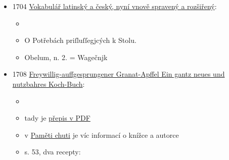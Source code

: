 \begin{itemize}
\begin{itemize}
    \begin{itemize}
    \tightlist
    \item
      č. 212 Gute Speiß-Krapfen:
    \item
      Vezmi jednu žejdlík (nádobu) dobrého sladkého mléka a kus másla o
      velikosti vejce. Nech je společně rozpustit, poté k tomu přidej 2
      lžíce pivovarských kvasnic a 5 žloutků -- vše dobře rozšlehané.
      Poté, když je přidána pěkná (hladká), předem nahřátá mouka,
      vypracuj tuhé těsto, které nelepí. Rukama ho dobře propracuj a
      vlož do mísy, kterou postav k peci, aby těsto vykynulo.
    \item
      Poté jej můžeš vyválet, rozkrájet na 3 kusy a vytvarovat do
      pěkných podlouhlých tvarů. Poté pomaž příslušný špíz (rožeň)
      máslem a nech ho nahřát. Těsto na něj dokola naviň a potři ho
      směsí drceného zázvoru a žloutků. Peč ho u jasného ohně, dokud
      neztuhne. Průběžně ho dobře potírej rozpuštěným máslem, dokud
      nezhnědne. Musí se jíst teplé.
    \end{itemize}
  \end{itemize}
\item
  1704
  \href{https://bara.ujc.cas.cz/slovniky/vokabular/vokabular12.html}{Vokabulář
  latinský a český, nyní vnově spravený a rozšiřený}:

  \begin{itemize}
  \tightlist
  \item
  \item
    O Potřebách priſluſſegjcých k Stolu.
  \item
    Obelum, n. 2. = Wagečnjk
  \end{itemize}
\item
  1708
  \href{https://unipub.uni-graz.at/obvugrdomus_druck/content/titleinfo/8109092}{Freywillig-auffgesprungener
  Granat-Apffel Ein gantz neues und nutzbahres Koch-Buch}:

  \begin{itemize}
  \tightlist
  \item
  \item
    tady je
    \href{https://unipub.uni-graz.at/download/pdf/8109092.pdf\#page=54}{přepis
    v PDF}
  \item
    v
    \href{https://kulturni-dejiny.slu.cz/data/uploads/067/upvysledky/pamet_chuti_odborna-kniha_uplatnny_2020.pdf\#page=133}{Paměti
    chuti} je víc informací o knížce a autorce
  \item
    s. 53, dva recepty:


\end{itemize}
\end{itemize}

